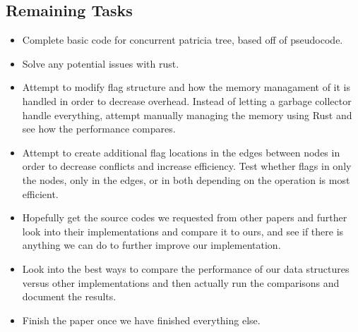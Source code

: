 \documentclass[conference]{IEEEtran}
\begin{document}
\subsection{Remaining Tasks}
\begin{itemize}
\item Complete basic code for concurrent patricia tree, based off of \cite{Shafiei2013} pseudocode. 
\item Solve any potential issues with rust.
\item Attempt to modify flag structure and how the memory managament of it is handled in order to decrease overhead. Instead of letting a garbage collector handle everything, attempt manually managing the memory using Rust and see how the performance compares. 
\item Attempt to create additional flag locations in the edges between nodes in order to decrease conflicts and increase efficiency. Test whether flags in only the nodes, only in the edges, or in both depending on the operation is most efficient.
\item Hopefully get the source codes we requested from other papers and further look into their implementations and compare it to ours, and see if there is anything we can do to further improve our implementation.
\item Look into the best ways to compare the performance of our data structures versus other implementations and then actually run the comparisons and document the results.
\item Finish the paper once we have finished everything else.
\end{itemize}




\end{document}

